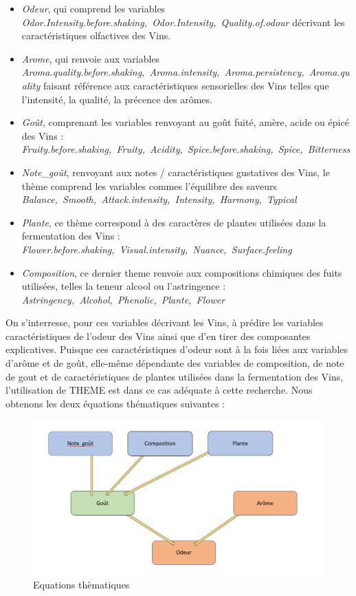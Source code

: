 \documentclass[a4paper,french,10pt]{article}
\begin{document}
\begin{itemize}
	\item \textit{Odeur}, qui comprend les variables \textit{Odor.Intensity.before.shaking,~Odor.Intensity,~Quality.of.odour} décrivant les caractéristiques olfactives des Vins. 
	\item \textit{Arome}, qui renvoie aux variables \textit{Aroma.quality.before.shaking,~Aroma.intensity,~Aroma.persistency,~Aroma.quality} faisant référence aux caractéristiques sensorielles des Vins telles que l'intensité, la qualité, la précence des arômes. 
	\item \textit{Goût}, comprenant les variables renvoyant au goût fuité, amère, acide ou épicé des Vins : \textit{Fruity.before.shaking,~Fruity,~Acidity,~Spice.before.shaking,~Spice,~Bitterness}
	\item \textit{Note\_goût}, renvoyant aux notes / caractéristiques gustatives des Vins, le thème comprend les variables commes l'équilibre des saveurs \textit{Balance,~Smooth,~Attack.intensity,~Intensity,~Harmony,~Typical}
	\item \textit{Plante}, ce thème correspond à des caractères de plantes utilisées dans la fermentation des Vins : \textit{Flower.before.shaking,~Visual.intensity,~Nuance,~Surface.feeling}
	\item \textit{Composition}, ce dernier theme renvoie aux compositions chimiques des fuits utilisées, telles la teneur alcool ou l'astringence : \textit{Astringency,~Alcohol,~Phenolic,~Plante,~Flower}
\end{itemize} 

On s'interresse, pour ces variables décrivant les Vins, à prédire les variables caractéristiques de l'odeur des Vins ainsi que d'en tirer des composantes explicatives. Puisque ces caractéristiques d'odeur sont à la fois liées aux variables d'arôme et de goût, elle-même dépendante des variables de composition, de note de gout et de caractéristiques de plantes utilisées dans la fermentation des Vins, l'utilisation de THEME est dans ce cas adéquate à cette recherche. Nous obtenons les deux équations thématiques suivantes : 

\begin{figure}[htp] 
	\centering
	\includegraphics[scale=0.45]{images/Eq_THEME.png}
	\caption{Equations thèmatiques}
\end{figure}
\end{document}
